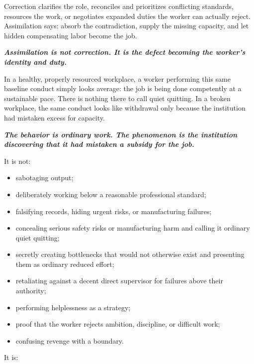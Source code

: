 \documentclass[11pt,oneside]{article}
\providecommand{\tightlist}{%
  \setlength{\itemsep}{0.22em}\setlength{\parskip}{0pt}}
\renewenvironment{quote}
  {\begin{tcolorbox}[
      enhanced,
      breakable,
      colback=ManifestLight,
      colframe=ManifestRule,
      boxrule=0pt,
      leftrule=3pt,
      arc=0pt,
      outer arc=0pt,
      left=10pt,right=10pt,top=8pt,bottom=8pt,
      before skip=0.8em,after skip=0.8em
    ]\itshape}
  {\end{tcolorbox}}
\begin{document}
Correction clarifies the role, reconciles and prioritizes conflicting
standards, resources the work, or negotiates expanded duties the worker
can actually reject. Assimilation says: absorb the contradiction, supply
the missing capacity, and let hidden compensating labor become the job.

\begin{quote}
\textbf{Assimilation is not correction. It is the defect becoming the
worker's identity and duty.}
\end{quote}

In a healthy, properly resourced workplace, a worker performing this
same baseline conduct simply looks average: the job is being done
competently at a sustainable pace. There is nothing there to call quiet
quitting. In a broken workplace, the same conduct looks like withdrawal
only because the institution had mistaken excess for capacity.

\begin{quote}
\textbf{The behavior is ordinary work. The phenomenon is the institution
discovering that it had mistaken a subsidy for the job.}
\end{quote}

It is not:

\begin{itemize}
\tightlist
\item
  sabotaging output;
\item
  deliberately working below a reasonable professional standard;
\item
  falsifying records, hiding urgent risks, or manufacturing failures;
\item
  concealing serious safety risks or manufacturing harm and calling it
  ordinary quiet quitting;
\item
  secretly creating bottlenecks that would not otherwise exist and
  presenting them as ordinary reduced effort;
\item
  retaliating against a decent direct supervisor for failures above
  their authority;
\item
  performing helplessness as a strategy;
\item
  proof that the worker rejects ambition, discipline, or difficult work;
\item
  confusing revenge with a boundary.
\end{itemize}

It is:
\end{document}
